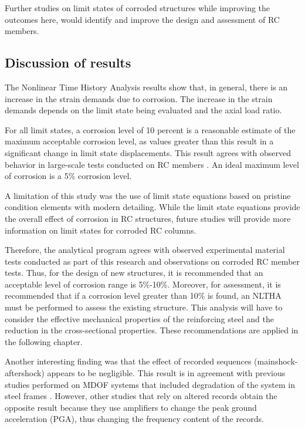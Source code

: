 Further studies on limit states of corroded structures while improving the outcomes here,  would identify and improve the design and assessment of RC members.

\subsection{Discussion of results}

The Nonlinear Time History Analysis results show that, in general, there is an increase in the strain demands due to corrosion. The increase in the strain demands depends on the limit state being evaluated and the axial load ratio. 

For all limit states, a corrosion level of 10 percent is a reasonable estimate of the maximum acceptable corrosion level, as values greater than this result in a significant change in limit state displacements. This result agrees with observed behavior in large-scale tests conducted on RC members \cite{Ma2012}\cite{Ma2018}. An ideal maximum level of corrosion is a 5\% corrosion level.

A limitation of this study was the use of limit state equations based on pristine condition elements with modern detailing. While the limit state equations provide the overall effect of corrosion in RC structures, future studies will provide more information on limit states for corroded RC columns.

Therefore, the analytical program agrees with observed experimental material tests conducted as part of this research and observations on corroded RC member tests. Thus, for the design of new structures, it is recommended that an acceptable level of corrosion range is 5\%-10\%. Moreover, for assessment, it is recommended that if a corrosion level greater than 10\% is found, an NLTHA must be performed to assess the existing structure. This analysis will have to consider the effective mechanical properties of the reinforcing steel and the reduction in the cross-sectional properties. These recommendations are applied in the following chapter. 

Another interesting finding was that the effect of recorded sequences (mainshock-aftershock) appears to be negligible. This result is in agreement with previous studies performed on MDOF systems that included degradation of the system in steel frames \cite{Ruiz-Garcia2011}. However, other studies that rely on altered records obtain the opposite result because they use amplifiers to change the peak ground acceleration (PGA), thus changing the frequency content of the records.